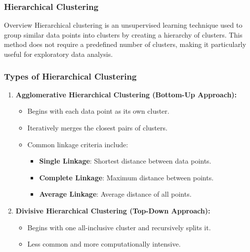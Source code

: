 \documentclass[aspectratio=169]{beamer}
\begin{document}
\begin{frame}
  \frametitle{Hierarchical Clustering}
  \begin{block}{Overview}
    Hierarchical clustering is an unsupervised learning technique used to group similar data points into clusters by creating a hierarchy of clusters. This method does not require a predefined number of clusters, making it particularly useful for exploratory data analysis.
  \end{block}
\end{frame}

\begin{frame}
  \frametitle{Types of Hierarchical Clustering}
  \begin{enumerate}
    \item \textbf{Agglomerative Hierarchical Clustering (Bottom-Up Approach):}
    \begin{itemize}
      \item Begins with each data point as its own cluster.
      \item Iteratively merges the closest pairs of clusters.
      \item Common linkage criteria include:
      \begin{itemize}
        \item \textbf{Single Linkage}: Shortest distance between data points.
        \item \textbf{Complete Linkage}: Maximum distance between points.
        \item \textbf{Average Linkage}: Average distance of all points.
      \end{itemize}
    \end{itemize}

    \item \textbf{Divisive Hierarchical Clustering (Top-Down Approach):}
    \begin{itemize}
      \item Begins with one all-inclusive cluster and recursively splits it.
      \item Less common and more computationally intensive.
    \end{itemize}
  \end{enumerate}
\end{frame}
\end{document}
